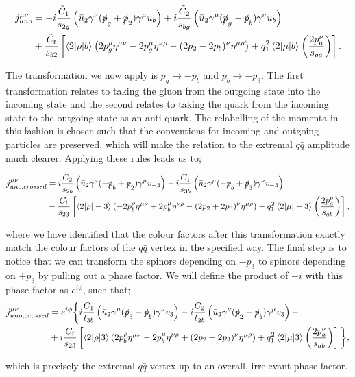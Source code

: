 \begin{equation}
\begin{split}
j_{uno}^{\mu \nu} &= -i \frac{\tilde{C}_1}{s_{2g}} \left(\bar{u}_2 \gamma^\nu (\slashed{p}_g + \slashed{p}_2) \gamma^\mu u_b \right) + i \frac{\tilde{C}_2}{s_{bg}} \left(\bar{u}_2 \gamma^\mu (\slashed{p}_g - \slashed{p}_b)\gamma^\nu u_b \right) \\
&+ \frac{\tilde{C}_t}{s_{b2}} \left[\mathinner{\langle2\vert\rho\vert b\rangle}_{} \left(2p_g^\rho \eta^{\mu \nu} - 2 p_g^\mu \eta^{\nu \rho} - (2p_2 - 2p_b)^\nu \eta^{\mu \rho} \right) + q_1^2 \mathinner{\langle2\vert\mu\vert b\rangle}_{} \left(\frac{2p_a^\nu}{s_{ga}} \right) \right].
\end{split}
\end{equation}

The transformation we now apply is $p_g \to -p_b$ and $p_b \to -p_3$. The first transformation relates to taking the gluon from the outgoing state into the incoming state and the second relates to taking the quark from the incoming state to the outgoing state as an anti-quark. The relabelling of the momenta in this fashion is chosen such that the conventions for incoming and outgoing particles are preserved, which will make the relation to the extremal $q\bar{q}$ amplitude much clearer. Applying these rules leads us to;

\begin{equation}
\begin{split}
j_{uno, crossed}^{\mu \nu} &= i \frac{C_2}{s_{2b}} \left(\bar{u}_2 \gamma^\nu (-\slashed{p}_b + \slashed{p}_2) \gamma^\mu v_{-3} \right) - i \frac{C_1}{s_{3b}} \left(\bar{u}_2 \gamma^\mu (-\slashed{p}_b + \slashed{p}_3)\gamma^\nu v_{-3} \right) \\
&- \frac{C_t}{s_{23}} \left[\mathinner{\langle2\vert\rho\vert-3\rangle}_{} \left(-2p_b^\rho \eta^{\mu \nu} + 2 p_b^\mu \eta^{\nu \rho} - (2p_2 + 2p_3)^\nu \eta^{\mu \rho} \right) - q_1^2 \mathinner{\langle2\vert\mu\vert-3\rangle}_{} \left(\frac{2p_a^\nu}{s_{ab}} \right) \right],
\end{split}
\end{equation}

where we have identified that the colour factors after this transformation exactly match the colour factors of the $q\bar{q}$ vertex in the specified way. The final step is to notice that we can transform the spinors depending on $-p_3$ to spinors depending on $+p_3$ by pulling out a phase factor. We will define the product of $-i$ with this phase factor as $e^{i \phi}$, such that;
\begin{equation}
\begin{split}
j_{uno, crossed}^{\mu \nu} &= e^{i\phi} \bigg \{ i \frac{C_1}{t_{3b}} \left(\bar{u}_2 \gamma^\mu (\slashed{p}_3 - \slashed{p}_b)\gamma^\nu v_3 \right) - i \frac{C_2}{t_{2b}} \left(\bar{u}_2 \gamma^\nu (\slashed{p}_2 - \slashed{p}_b) \gamma^\mu v_3 \right) -  \\
& +i \frac{C_t}{s_{23}} \left[\mathinner{\langle2\vert\rho\vert3\rangle}_{} \left(2p_b^\rho \eta^{\mu \nu} - 2 p_b^\mu \eta^{\nu \rho} + (2p_2 + 2p_3)^\nu \eta^{\mu \rho} \right) + q_1^2 \mathinner{\langle2\vert\mu\vert3\rangle}_{} \left(\frac{2p_a^\nu}{s_{ab}} \right) \right] \bigg \},
\end{split}
\end{equation}

which is precisely the extremal $q\bar{q}$ vertex up to an overall, irrelevant phase factor. 


